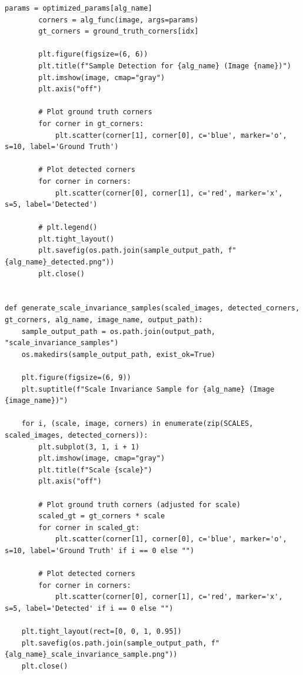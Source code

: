 \documentclass[journal]{IEEEtran}
\begin{document}
\begin{lstlisting}[style=python, caption={Utility Functions for Data Processing}, label={lst:utilities}]
        params = optimized_params[alg_name]
        corners = alg_func(image, args=params)
        gt_corners = ground_truth_corners[idx]
        
        plt.figure(figsize=(6, 6))
        plt.title(f"Sample Detection for {alg_name} (Image {name})")
        plt.imshow(image, cmap="gray")
        plt.axis("off")
        
        # Plot ground truth corners
        for corner in gt_corners:
            plt.scatter(corner[1], corner[0], c='blue', marker='o', s=10, label='Ground Truth')
            
        # Plot detected corners
        for corner in corners:
            plt.scatter(corner[0], corner[1], c='red', marker='x', s=5, label='Detected')
        
        # plt.legend()
        plt.tight_layout()
        plt.savefig(os.path.join(sample_output_path, f"{alg_name}_detected.png"))
        plt.close()
        
        
def generate_scale_invariance_samples(scaled_images, detected_corners, gt_corners, alg_name, image_name, output_path):
    sample_output_path = os.path.join(output_path, "scale_invariance_samples")
    os.makedirs(sample_output_path, exist_ok=True)
    
    plt.figure(figsize=(6, 9))
    plt.suptitle(f"Scale Invariance Sample for {alg_name} (Image {image_name})")
    
    for i, (scale, image, corners) in enumerate(zip(SCALES, scaled_images, detected_corners)):
        plt.subplot(3, 1, i + 1)
        plt.imshow(image, cmap="gray")
        plt.title(f"Scale {scale}")
        plt.axis("off")
        
        # Plot ground truth corners (adjusted for scale)
        scaled_gt = gt_corners * scale
        for corner in scaled_gt:
            plt.scatter(corner[1], corner[0], c='blue', marker='o', s=10, label='Ground Truth' if i == 0 else "")

        # Plot detected corners
        for corner in corners:
            plt.scatter(corner[0], corner[1], c='red', marker='x', s=5, label='Detected' if i == 0 else "")       
    
    plt.tight_layout(rect=[0, 0, 1, 0.95])
    plt.savefig(os.path.join(sample_output_path, f"{alg_name}_scale_invariance_sample.png"))
    plt.close()
    


\end{lstlisting}
\end{document}
